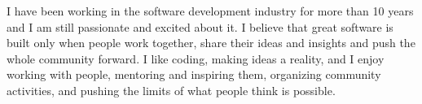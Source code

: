 \documentclass[9pt]{developercv} %
\begin{document}
\vspace{0.5cm}



\begin{minipage}[t]{0.4\textwidth} %
	\vspace{-\baselineskip} %
	
	I have been working in the software development industry for more than 10 years and I
	am still passionate and excited about it. I believe that great software is built
	only when people work together, share their ideas and insights and push the whole
	community forward. I like coding, making ideas a reality, and I enjoy working with
	people, mentoring and inspiring them, organizing community activities, and pushing
	the limits of what people think is possible.
\end{minipage}
\hfill %
\begin{minipage}[t]{0.5\textwidth} %
	\vspace{-\baselineskip} %
	\begin{barchart}{5.5}
	\end{barchart}
\end{minipage}

\begin{center}
\end{center}


\end{document}
